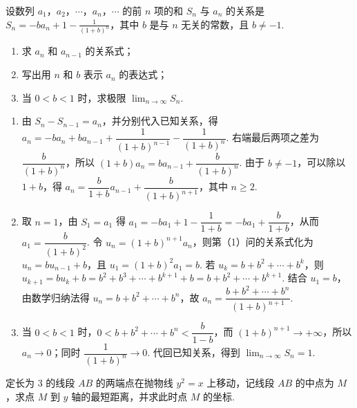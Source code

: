 \documentclass[UTF8,a4paper,oneside,11pt]{ctexbook}
\begin{document}
\begin{problem}

设数列 \(a_1\)，\(a_2\)，\(\cdots\)，\(a_n\)，\(\cdots\) 的前 \(n\) 项的和 \(S_n\) 与 \(a_n\) 的关系是 \(S_n = -ba_n + 1 - \frac{1}{(1+b)^n}\)，其中 \(b\) 是与 \(n\) 无关的常数，且 \(b \neq -1\).

\begin{enumerate}
\item 求 \(a_n\) 和 \(a_{n-1}\) 的关系式；
\item 写出用 \(n\) 和 \(b\) 表示 \(a_n\) 的表达式；
\item 当 \(0 < b < 1\) 时，求极限 \(\displaystyle\lim_{n\to\infty} S_n\).
\end{enumerate}
\end{problem}

\begin{solution}
\begin{enumerate}
\item 由 \(S_n-S_{n-1}=a_n\)，并分别代入已知关系，得
\(a_n=-ba_n+ba_{n-1}+\dfrac{1}{(1+b)^{n-1}}-\dfrac{1}{(1+b)^n}\). 右端最后两项之差为
\(\dfrac{b}{(1+b)^n}\)，所以
\((1+b)a_n=ba_{n-1}+\dfrac{b}{(1+b)^n}\). 由于 \(b\ne-1\)，可以除以 \(1+b\)，得
\(a_n=\dfrac{b}{1+b}a_{n-1}+\dfrac{b}{(1+b)^{n+1}}\)，其中 \(n\geqslant2\).
\item 取 \(n=1\)，由 \(S_1=a_1\) 得
\(a_1=-ba_1+1-\dfrac{1}{1+b}=-ba_1+\dfrac{b}{1+b}\)，从而
\(a_1=\dfrac{b}{(1+b)^2}\). 令 \(u_n=(1+b)^{n+1}a_n\)，则第（1）问的关系式化为
\(u_n=bu_{n-1}+b\)，且 \(u_1=(1+b)^2a_1=b\). 若 \(u_k=b+b^2+\cdots+b^k\)，则
\(u_{k+1}=bu_k+b=b^2+b^3+\cdots+b^{k+1}+b=b+b^2+\cdots+b^{k+1}\). 结合 \(u_1=b\)，由数学归纳法得
\(u_n=b+b^2+\cdots+b^n\)，故
\(a_n=\dfrac{b+b^2+\cdots+b^n}{(1+b)^{n+1}}\).
\item 当 \(0<b<1\) 时，\(0<b+b^2+\cdots+b^n<\dfrac{b}{1-b}\)，而 \((1+b)^{n+1}\to+\infty\)，所以 \(a_n\to0\)；同时 \(\dfrac{1}{(1+b)^n}\to0\). 代回已知关系，得到
\(\displaystyle\lim_{n\to\infty}S_n=1\).
\end{enumerate}
\end{solution}

\begin{problem}

定长为 \(3\) 的线段 \(AB\) 的两端点在抛物线 \(y^2 = x\) 上移动，记线段 \(AB\) 的中点为 \(M\)，求点 \(M\) 到 \(y\) 轴的最短距离，并求此时点 \(M\) 的坐标.
\end{problem}
\end{document}
